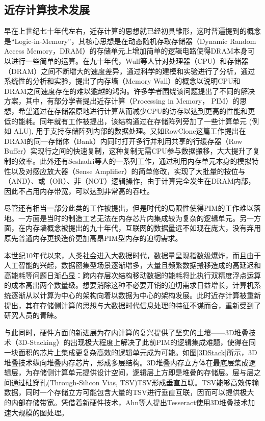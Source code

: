 \subsection{近存计算技术发展}
早在上世纪七十年代左右，近存计算的思想就已经\cite{CellularLogicInMemory,LogicInMemory}初具雏形，这时普遍提到的概念是“Logic-in-Memory”，其核心思想是在动态随机存取存储器（Dynamic Random Access Memory，DRAM）的存储单元上增加简单的逻辑电路使得DRAM本身可以进行一些简单的运算。在九十年代，Wulf等人针对处理器（CPU）和存储器（DRAM）之间不断增大的速度差异，通过科学的建模和实验进行了分析，通过系统性的分析和实验，提出了内存墙（Memory Wall）的概念以说明CPU和DRAM之间速度存在的难以逾越的鸿沟\cite{MemoryWall}。许多学者围绕该问题提出了不同的解决方案，其中，有部分学者提出近存计算（Processing in Memory， PIM）的思想，希望通过在存储器原地进行计算从而减少CPU的访存以达到更高的性能和更低的能耗。同年就有工作\cite{MicroArchitecturePIM}被提出，该结构通过在存储阵列旁加了一些计算单元 (例如 ALU), 用于支持存储阵列内部的数据处理。又如RowClone这篇工作\cite{RowClone}提出在DRAM的同一存储体（Bank）内同时打开多行并利用共享的行缓存器（Row Buffer）实现行之间的快速复制，这种复制无需CPU参与数据搬移，大大提升了复制的效率。此外还有Seshadri等人\cite{BitAndOr,Ambit}的一系列工作，通过利用内存单元本身的模拟特性以及对感应放大器（Sense Amplifier）的简单修改，实现了大批量的按位与（AND）、或（OR）、非（NOT）逻辑操作，由于计算完全发生在DRAM内部，因此不占用内存带宽，可以达到非常高的吞吐。

尽管还有相当一部分此类的工作被提出，但是时代的局限性使得PIM的工作难以落地。一方面是当时的制造工艺无法在内存芯片内集成较为复杂的逻辑单元。另一方面，在内存墙概念被提出的九十年代，互联网的数据量远不如现在庞大，没有弃用原先普通内存更换造价更加高昂PIM型内存的迫切需求\cite{NDPWorkshop}。

本世纪10年代以来，人类社会进入大数据时代，数据量呈现指数级爆炸，而且由于人工智能的兴起，数据密集型场景逐渐增多，大量且频繁数据搬移造成的高延迟和高能耗等问题日渐凸显：跨内存层次结构移动数据的能耗将比执行双精度浮点运算的成本高出两个数量级\cite{EnergyCost}。想要消除这种不必要开销的迫切需求日益增长，计算机系统逐渐从以计算为中心的架构向着以数据为中心的架构发展。此时近存计算被重新提出，其在存储侧计算的思想与大数据时代信息处理的特征不谋而合，重新受到了研究人员的青睐。

与此同时，硬件方面的新进展为存内计算的复兴提供了坚实的土壤——3D堆叠技术（3D-Stacking）的出现极大程度上解决了此前PIM的逻辑集成难题，使得在同一块面积的芯片上集成更复杂高效的逻辑单元成为可能。如图\ref{3DStack}所示，3D堆叠技术纵向堆叠内存芯片，形成多层结构。3D堆叠内存立方体在最底层集成逻辑层，为存储侧计算单元提供设计空间，逻辑层上方即是堆叠的存储层。层与层之间通过硅穿孔(Through-Silicon Vias, TSV)TSV形成垂直互联。TSV能够高效传输数据，同时一个存储立方可能包含大量的TSV进行垂直互联，因而可以提供极大的内部存储带宽。凭借着新硬件技术，Ahn等人\cite{Tesseract}提出Tesseract使用3D堆叠技术加速大规模的图处理。


